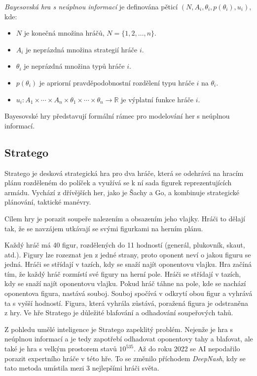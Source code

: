 \emph{Bayesovská hra s neúplnou informací} \cite{Y_Narahari} je definována pěticí $(N, A_i, \theta_i, p(\theta_i), u_i)$, kde:

\begin{itemize}
\item $N$ je konečná množina hráčů, $N = \{1, 2, \ldots, n\}$.
\item $A_i$ je neprázdná množina strategií hráče $i$.
\item $\theta_i$ je neprázdná množina typů hráče $i$.
\item $p(\theta_i)$ je apriorní pravděpodobnostní rozdělení typu hráče $i$ na $\theta_i$.
\item $u_i: A_1 \times \cdots \times A_n \times \theta_1 \times \cdots \times \theta_n \rightarrow \mathbb{R}$ je výplatní funkce hráče $i$.
\end{itemize}

Bayesovské hry představují formální rámec pro modelování her s neúplnou informací.

\subsection*{Stratego}

Stratego je desková strategická hra pro dva hráče, která se odehrává na hracím plánu rozděleném do políček a využívá se k ní sada figurek reprezentujících armádu.
Vychází z dřívějších her, jako je Šachy a Go, a kombinuje strategické plánování, taktické manévry.

Cílem hry je porazit soupeře nalezením a obsazením jeho vlajky.
Hráči to dělají tak, že se navzájem utkávají se svými figurkami na herním plánu.

Každý hráč má 40 figur, rozdělených do 11 hodností (generál, plukovník, skaut, atd.).
Figury lze rozeznat jen z jedné strany, proto oponent neví o jakou figuru se jedná.
Hráči se střídají v tazích, kdy se snaží najít oponentovu vlajku.
Hra začíná tím, že každý hráč rozmístí své figury na herní pole.
Hráči se střídají v tazích, kdy se snaží najít oponentovu vlajku.
Pokud hráč táhne na pole, kde se nachází oponentova figura, nastává souboj.
Souboj spočívá v odkrytí obou figur a vyhrává ta s vyšší hodností.
Figura, která vyhrála zůstává, poražená figura je odstraněna z hry.
Ve hře Stratego je důležité blafování a odhadování soupeřových tahů.

Z pohledu umělé inteligence je Stratego zapeklitý problém.
Nejenže je hra s neúplnou informací a je tedy zapotřebí odhadovat oponentovy tahy a blafovat, ale také je hra s velkým prostorem stavů $10^{535}$\cite{Perolat_2022}.
Až do roku 2022 se AI nepodařilo porazit expertního hráče v této hře.
To se změnilo příchodem \emph{DeepNash}\cite{Perolat_2022}, kdy se tato metoda umístila mezi 3 nejlepšími hráči světa.



